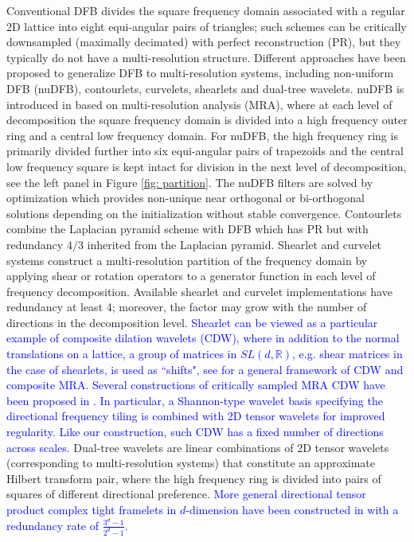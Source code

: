 Conventional DFB \cite{DFB92} divides the square frequency domain associated with a regular 2D lattice into eight equi-angular pairs of triangles; such schemes can be critically downsampled (maximally decimated) with perfect reconstruction (PR), but they typically do not have a multi-resolution structure. 
Different approaches have been proposed to generalize DFB to multi-resolution systems, including non-uniform DFB (nuDFB), contourlets, curvelets, shearlets and dual-tree wavelets.
nuDFB is introduced in \cite{nuDFB05} based on multi-resolution analysis (MRA), where at each level of decomposition the square frequency domain is divided into a high frequency outer ring and a central low frequency domain. For nuDFB, the high frequency ring is primarily divided further into six equi-angular pairs of trapezoids and the central low frequency square is kept intact for division in the next level of decomposition, see the left panel in Figure \ref{fig: partition}. The nuDFB filters are solved by optimization which provides non-unique near orthogonal or bi-orthogonal solutions depending on the initialization without stable convergence.
Contourlets \cite{do2005contourlet} combine the Laplacian pyramid scheme with DFB which has PR but with redundancy $4/3$ inherited from the Laplacian pyramid.
Shearlet \cite{shearlet12book,easley2008sparse} and curvelet \cite{candes2006fast} systems construct a multi-resolution partition of the frequency domain by applying shear or rotation operators to a generator function in each level of frequency decomposition. Available shearlet and curvelet implementations have redundancy at least 4; moreover, the factor may grow with the number of directions in the decomposition level.
\textcolor{blue}{Shearlet can be viewed as a particular example of composite dilation wavelets (CDW), where in addition to the normal translations on a lattice, a group of matrices in $SL(d, \mathbb{R})$, e.g. shear matrices in the case of shearlets, is used as ``shifts", see \cite{blanchard2012matricial} for a general framework of CDW and composite MRA. Several constructions of critically sampled MRA CDW have been proposed in \cite{easley2012critically}. In particular, a Shannon-type wavelet basis specifying the directional frequency tiling is combined with 2D tensor wavelets for improved regularity. Like our construction, such CDW has a fixed number of directions across scales.}
Dual-tree wavelets \cite{selesnick2005dual} are linear combinations of 2D tensor wavelets (corresponding to multi-resolution systems) that constitute an approximate Hilbert transform pair, where the high frequency ring is divided into pairs of squares of different directional preference.
\textcolor{blue}{More general directional tensor product complex tight framelets in $d$-dimension have been constructed in \cite{han2016directional} with a redundancy rate of $\frac{3^d -1}{2^d-1}$.
}


